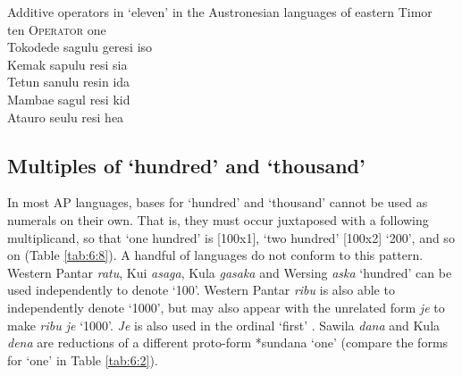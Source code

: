 \let\eachwordone=\rm
\let\eachwordtwo=\it
\let\eachwordthree=\it
\let\eachwordfour=\it
\let\eachwordfive=\it 
\let\eachwordsix\it 

\ea%
\label{ex:6:16}
Additive operators in `eleven' in the Austronesian languages of eastern Timor\\
\gllllll {}  ten    O\textsc{perator}    one  \\
{\rm Tokodede}    sagulu  geresi    iso           \\
{\rm Kemak}     sapulu  resi    sia           \\
{\rm Tetun}    sanulu  resin    ida           \\
{\rm Mambae}    sagul    resi    kid           \\
{\rm Atauro}    se{\ng}ulu  resi    hea           \\
\z

      
\let\eachwordone=\it
\let\eachwordtwo=\rm
\let\eachwordthree=\rm
\let\eachwordfour=\rm
\let\eachwordfive=\rm 
\let\eachwordsix=\rm   







\subsection{Multiples of `hundred' and `thousand'} \label{sec:6:6.3}
In most AP languages, bases for `hundred' and `thousand' cannot be used as numerals on their own. That is, they must occur juxtaposed with a following multiplicand, so that `one hundred' is [100x1], `two hundred' [100x2] `200', and so on (Table \ref{tab:6:8}). A handful of languages do not conform to this pattern. Western Pantar \textit{ratu}, Kui \textit{asaga}, Kula \textit{gasaka} and Wersing \textit{aska} `hundred' can be used independently to denote `100'. Western Pantar \textit{ribu} is also able to independently denote `1000', but may also appear with the unrelated form \textit{je} to make \textit{ribu je} `1000'. \textit{Je} is also used in the ordinal `first' \citep{KlamerEtAlTV}. Sawila \textit{dana} and Kula \textit{dena} are reductions of a different proto-form *sundana `one' (compare the forms for `one' in Table \ref{tab:6:2}).


 


